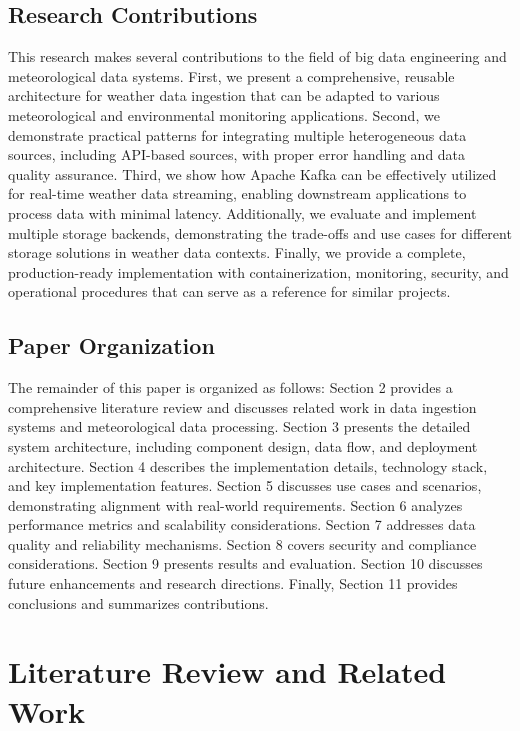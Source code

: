 \documentclass[12pt,a4paper]{article}
\begin{document}
\subsection{Research Contributions}

This research makes several contributions to the field of big data engineering and meteorological data systems. First, we present a comprehensive, reusable architecture for weather data ingestion that can be adapted to various meteorological and environmental monitoring applications. Second, we demonstrate practical patterns for integrating multiple heterogeneous data sources, including API-based sources, with proper error handling and data quality assurance. Third, we show how Apache Kafka can be effectively utilized for real-time weather data streaming, enabling downstream applications to process data with minimal latency. Additionally, we evaluate and implement multiple storage backends, demonstrating the trade-offs and use cases for different storage solutions in weather data contexts. Finally, we provide a complete, production-ready implementation with containerization, monitoring, security, and operational procedures that can serve as a reference for similar projects.

\subsection{Paper Organization}

The remainder of this paper is organized as follows: Section 2 provides a comprehensive literature review and discusses related work in data ingestion systems and meteorological data processing. Section 3 presents the detailed system architecture, including component design, data flow, and deployment architecture. Section 4 describes the implementation details, technology stack, and key implementation features. Section 5 discusses use cases and scenarios, demonstrating alignment with real-world requirements. Section 6 analyzes performance metrics and scalability considerations. Section 7 addresses data quality and reliability mechanisms. Section 8 covers security and compliance considerations. Section 9 presents results and evaluation. Section 10 discusses future enhancements and research directions. Finally, Section 11 provides conclusions and summarizes contributions.

\newpage
\section{Literature Review and Related Work}
\end{document}
